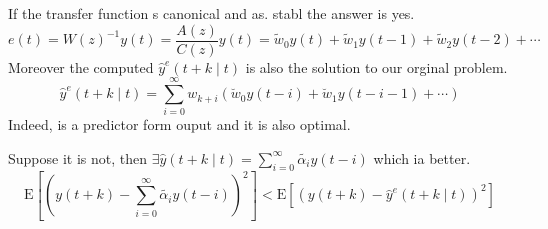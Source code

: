 If the transfer function s canonical and as. stabl the answer is yes.
$$
e(t)=W(z)^{-1} y(t)=\frac{A(z)}{C(z)} y(t)=\widetilde{w}_{0} y(t)+\widetilde{w}_{1} y(t-1)+\widetilde{w}_{2} y(t-2)+\cdots
$$
Moreover the computed $\hat{y}^e(t+k \mid t)$ is also the solution to our orginal problem.
$$
\hat{y}^e(t+k \mid t)=\sum_{i=0}^{\infty} w_{k+i}\left(\breve{w}_{0} y(t-i)+\breve{w}_{1} y(t-i-1)+\cdots\right)
$$
Indeed, is a predictor form ouput and it is also optimal.

Suppose it is not, then $\exists \hat{y}(t+k \mid t)=\sum_{i=0}^{\infty} \tilde{\alpha_i}y(t-i)$ which ia better.
$$
\mathrm{E}\left[(y(t+k)-\sum_{i=0}^{\infty} \tilde{\alpha_i}y(t-i))^2\right]<\mathrm{E}\left[(y(t+k)-\hat{y}^e(t+k \mid t))^{2}\right]
$$


 